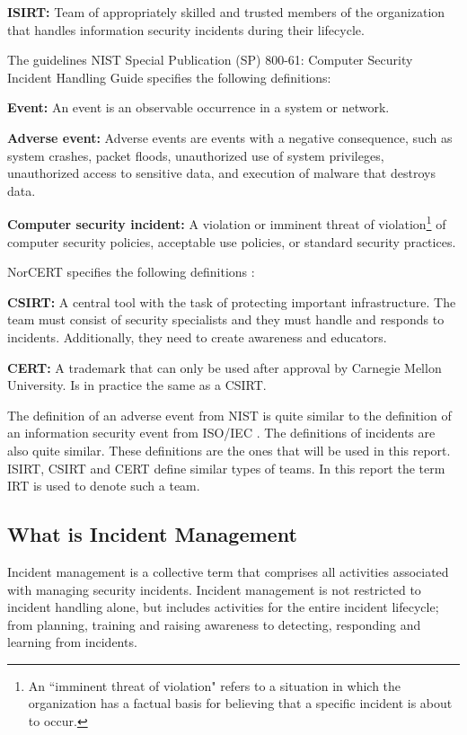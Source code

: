 \textbf{\ac{ISIRT}:} Team of appropriately skilled and trusted members of the organization that handles information security incidents during their lifecycle.

The guidelines \acs{NIST} Special Publication (SP) 800-61: Computer Security Incident Handling
Guide \cite{nist800-61} specifies the following definitions:

\textbf{Event:} An event is an observable occurrence in a system or network.

\textbf{Adverse event:} Adverse events are events with a negative consequence, such as system crashes, packet floods, unauthorized use of system privileges, unauthorized access to sensitive data, and execution of malware that destroys data.

\textbf{Computer security incident:} A violation or imminent threat of violation\footnote{An ``imminent threat of violation" refers to a situation in which the organization has a factual basis for believing that a specific incident is about to occur.} of computer security policies, acceptable use policies, or standard security practices.

\acs{NorCERT} specifies the following definitions \cite{NorCERT3Kvartal2012}:

\textbf{\ac{CSIRT}:} A central tool with the task of protecting important infrastructure. The team must consist of security specialists and they must handle and responds to incidents. Additionally, they need to create awareness and educators.

\textbf{\ac{CERT}:} A trademark that can only be used after approval by Carnegie Mellon University. Is in practice the same as a \acs{CSIRT}.

The definition of an adverse event from \acs{NIST} \cite{nist800-61} is quite similar to the definition of an information security event from ISO/IEC \cite{ISO/IEC27000}. The definitions of incidents are also quite similar. These definitions are the ones that will be used in this report. \ac{ISIRT}, \ac{CSIRT} and \ac{CERT} define similar types of teams. In this report the term \acs{IRT} is used to denote such a team. 

\subsection{What is Incident Management}
Incident management is a collective term that comprises all activities associated with managing security incidents. Incident management is not restricted to incident handling alone, but includes activities for the entire incident lifecycle; from planning, training and raising awareness to detecting, responding and learning from incidents. 

